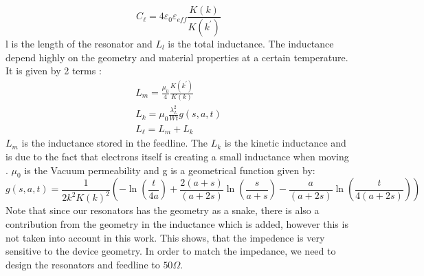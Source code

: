         \begin{equation}
            C_{\ell}=4 \varepsilon_0 \varepsilon_{e f f} \frac{K(k)}{K\left(k^{\prime}\right)}
        \end{equation}
        l is the length of the resonator and $L_{l}$ is the total inductance. The inductance depend highly on the geometry and material properties at a certain temperature. It is given by 2 terms \cite{Schuster2007}:
        \begin{equation}
            \begin{gathered}
                L_m=\frac{\mu_0}{4} \frac{K\left(k^{\prime}\right)}{K(k)} \\
                L_k=\mu_0 \frac{\lambda_L^2}{W t} g(s, a, t) \\
                L_{\ell} = L_{m} + L_{k}
            \end{gathered}
        \end{equation}
        $L_m$ is the inductance stored in the feedline. The $L_k$ is the kinetic inductance and is due to the fact that electrons itself is creating a small inductance when moving \cite{Schuster2007}. $\mu_{0}$ is the Vacuum permeability and g is a geometrical function given by: 
        \begin{equation}
            g(s, a, t)=\frac{1}{2 k^2 K(k)^2}\left(-\ln \left(\frac{t}{4 a}\right)+\frac{2(a+s)}{(a+2 s)} \ln \left(\frac{s}{a+s}\right)-\frac{a}{(a+2 s)} \ln \left(\frac{t}{4(a+2 s)}\right)\right)
        \end{equation}
        Note that since our resonators has the geometry as a snake, there is also a contribution from the geometry in the inductance which is added, however this is not taken into account in this work. This shows, that the impedence is very sensitive to the device geometry. In order to match the impedance, we need to design the resonators and feedline to $ 50 \Omega$. 

    


